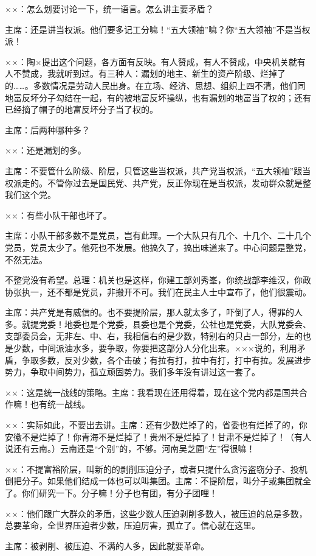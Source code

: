 ××：怎么划要讨论一下，统一语言。怎么讲主要矛盾？

主席：还是讲当权派。他们要多记工分嘛！“五大领袖”嘛？你“五大领袖”不是当权派！

××：陶×提出这个问题，各方面有反映。有人赞成，有人不赞成，中央机关就有人不赞成，我就听到过。有三种人：漏划的地主、新生的资产阶级、烂掉了的……。多数情况是劳动人民出身。在立场、经济、思想、组织上四不清，他们同地富反坏分子勾结在一起，有的被地富反坏操纵，也有漏划的地富当了权的；还有已经摘了帽子的地富反坏分子当了权的。

主席：后两种哪种多？

××：还是漏划的多。

主席：不要管什么阶级、阶层，只管这些当权派，共产党当权派，“五大领袖”跟当权派走的。不管你过去是国民党、共产党，反正你现在是当权派，发动群众就是整我们这个党。

××：有些小队干部也坏了。

主席：小队干部多数不是党员，岂有此理。一个大队只有几个、十几个、二十几个党员，党员太少了。他死也不发展。他搞久了，搞出味道来了。中心问题是整党，不然无法。

不整党没有希望。总理：机关也是这样，你建工部刘秀峯，你统战部李维汉，你政协张执一，还不都是党员，非搬开不可。我们在民主人士中宣布了，他们很震动。

主席：共产党是有威信的。也不要提阶层，那人就太多了，吓倒了人，得罪的人多。就提党委！地委也是个党委，县委也是个党委，公社也是党委，大队党委会、支部委员会，无非左、中、右，我相信右的是少数，特别右的只占一部分，左的也是少数，中间派油水多，要争取，你要把这部分人分化出来。×××说的，利用矛盾，争取多数，反对少数，各个击破；有拉有打，拉中有打，打中有拉。发展进步势力，争取中间势力，孤立顽固势力。我们多年没有讲过这一套了。

××：这是统一战线的策略。主席：我看现在还用得着，现在这个党内都是国共合作嘛！也有统一战线。

××：实际如此，不要出去讲。主席：还有少数烂掉了的，省委也有烂掉了的，你安徽不是烂掉了！你青海不是烂掉了！贵州不是烂掉了！甘肃不是烂掉了！（有人说还有云南。）云南还是“个别”的，不够。河南吴芝圃“左”得很嘛！

××：不提富裕阶层，叫新的的剥削压迫分子，或者只提什么贪污盗窃分子、投机倒把分子。如果他们结成一体也可以叫集团。主席：不提阶层，叫分子或集团就全了。你们研究一下。分子嘛！分子也有团，有分子团哩！

××：他们跟广大群众的矛盾，这些少数人压迫剥削多数人，被压迫的总是多数，总要革命，全世界压迫者少数，压迫厉害，孤立了。信心就在这里。

主席：被剥削、被压迫、不满的人多，因此就要革命。

